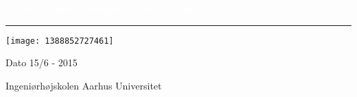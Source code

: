 \thispagestyle{empty} %

\BgThispage
{}
\vspace*{2cm}
\noindent
\textcolor{white}{\bigsf Electromyographic recognition using machine learning}
\vspace*{2.5cm}\par
\noindent
\begin{minipage}{0.45\linewidth}
    \begin{flushright}
        \printauthor
    \end{flushright}
\end{minipage} \hspace{30pt}
%
\begin{minipage}{0.02\linewidth}
    \rule{1pt}{275pt}
\end{minipage} \hspace{-10pt}
%
\begin{minipage}{0.6\linewidth}
\vspace{5pt}
 

\texttt{[image: 1388852727461]}
  
Dato 15/6 - 2015 \newline

Ingeniørhøjskolen Aarhus Universitet \newline



\end{minipage}
\restoregeometry